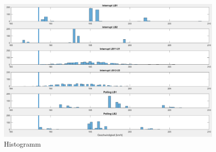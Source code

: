 \begin{figure}[ht]
    \centering
    \includegraphics[width=\textwidth]{images/hist.png}
    \caption{Histogramm}
    \label{fig:Hist}
\end{figure}

